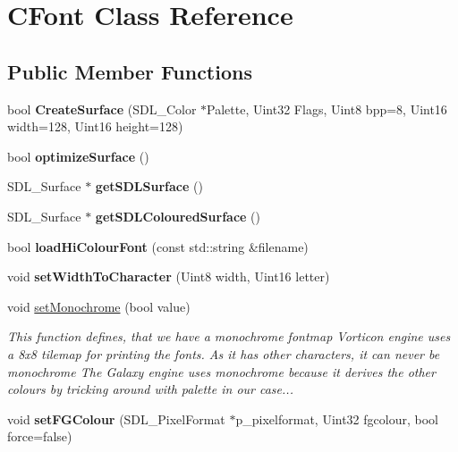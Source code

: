 \hypertarget{class_c_font}{
\section{CFont Class Reference}
\label{class_c_font}
}
\subsection*{Public Member Functions}
\begin{DoxyCompactItemize}
\item 
\hypertarget{class_c_font_a5a98f868be9c5a4bc3bbba005436962b}{
bool {\bfseries CreateSurface} (SDL\_\-Color $\ast$Palette, Uint32 Flags, Uint8 bpp=8, Uint16 width=128, Uint16 height=128)}
\label{class_c_font_a5a98f868be9c5a4bc3bbba005436962b}

\item 
\hypertarget{class_c_font_ae8d517335b1019d12190794f92020dd5}{
bool {\bfseries optimizeSurface} ()}
\label{class_c_font_ae8d517335b1019d12190794f92020dd5}

\item 
\hypertarget{class_c_font_a1994c24c13e669195a84e3f340ae421c}{
SDL\_\-Surface $\ast$ {\bfseries getSDLSurface} ()}
\label{class_c_font_a1994c24c13e669195a84e3f340ae421c}

\item 
\hypertarget{class_c_font_a29820152e89e38c3daa7f398c5688b4d}{
SDL\_\-Surface $\ast$ {\bfseries getSDLColouredSurface} ()}
\label{class_c_font_a29820152e89e38c3daa7f398c5688b4d}

\item 
\hypertarget{class_c_font_a99be114ae59565c47a22591b47652a6d}{
bool {\bfseries loadHiColourFont} (const std::string \&filename)}
\label{class_c_font_a99be114ae59565c47a22591b47652a6d}

\item 
\hypertarget{class_c_font_a7d5dce0433c09fd02a825aa04bbd9895}{
void {\bfseries setWidthToCharacter} (Uint8 width, Uint16 letter)}
\label{class_c_font_a7d5dce0433c09fd02a825aa04bbd9895}

\item 
void \hyperlink{class_c_font_a016ae0598f2cc8d985790c0204b31663}{setMonochrome} (bool value)
\begin{DoxyCompactList}\small\item\em This function defines, that we have a monochrome fontmap Vorticon engine uses a 8x8 tilemap for printing the fonts. As it has other characters, it can never be monochrome The Galaxy engine uses monochrome because it derives the other colours by tricking around with palette in our case... \item\end{DoxyCompactList}\item 
\hypertarget{class_c_font_a0eb491d728e89b282181b0f12b578b93}{
void {\bfseries setFGColour} (SDL\_\-PixelFormat $\ast$p\_\-pixelformat, Uint32 fgcolour, bool force=false)}
\label{class_c_font_a0eb491d728e89b282181b0f12b578b93}


\end{DoxyCompactItemize}

